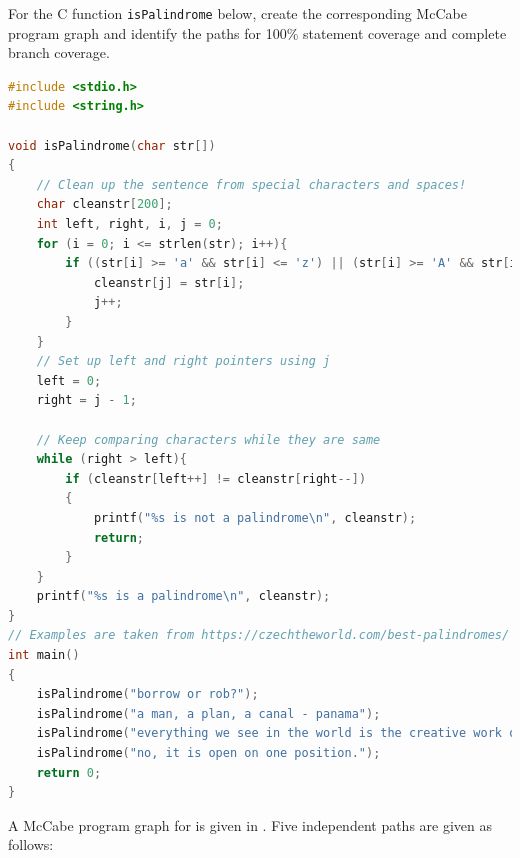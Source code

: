 \begin{example}
For the C function \lstinline!isPalindrome! below, create the corresponding McCabe program graph and identify the paths for 100\% statement coverage and complete branch coverage.
\begin{lstlisting}[language=C, caption={A C program to check if a given string is a palindrome or not.}]
#include <stdio.h>
#include <string.h>
 
void isPalindrome(char str[])
{
    // Clean up the sentence from special characters and spaces!
    char cleanstr[200];
    int left, right, i, j = 0;
    for (i = 0; i <= strlen(str); i++){
	   	if ((str[i] >= 'a' && str[i] <= 'z') || (str[i] >= 'A' && str[i] <= 'Z')){
		 	cleanstr[j] = str[i];
		 	j++;
    	}
    }
	// Set up left and right pointers using j
   	left = 0;
    right = j - 1;
 
    // Keep comparing characters while they are same
    while (right > left){
	    if (cleanstr[left++] != cleanstr[right--])
        {
            printf("%s is not a palindrome\n", cleanstr);
            return;
        }
    }
    printf("%s is a palindrome\n", cleanstr);		    
}
// Examples are taken from https://czechtheworld.com/best-palindromes/
int main()
{
    isPalindrome("borrow or rob?");
    isPalindrome("a man, a plan, a canal - panama");
    isPalindrome("everything we see in the world is the creative work of women.");
    isPalindrome("no, it is open on one position.");
    return 0;
}

\end{lstlisting}
\end{example}
A McCabe program graph for  is given in . Five independent paths are given as follows:

